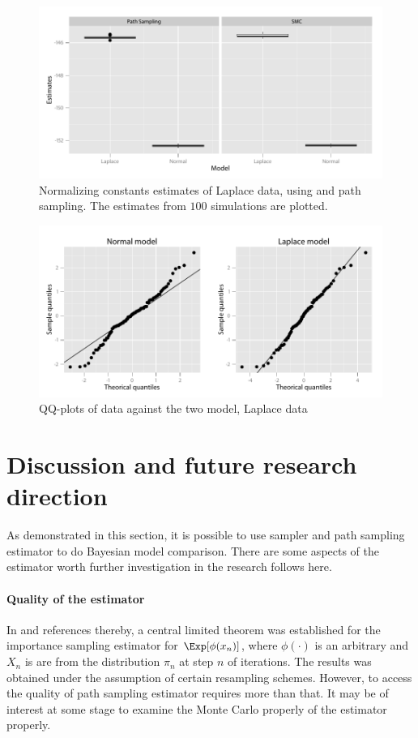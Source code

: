 \begin{figure}[htb]
  \centering
  \includegraphics{fig/5-lz}
  \caption{Normalizing constants estimates of Laplace data, using \smc and
    path sampling. The estimates from $100$ simulations are plotted.}
  \label{fig:laplace_z}
\end{figure}

\begin{figure}[htb]
  \centering
  \includegraphics{fig/5-lqq}
  \caption{QQ-plots of data against the two model, Laplace data}
  \label{fig:laplace_qq}
\end{figure}

\section{Discussion and future research direction}
\label{sec:Discussion and future research direction}

As demonstrated in this section, it is possible to use \smc sampler and path
sampling estimator to do Bayesian model comparison. There are some aspects of
the estimator worth further investigation in the research follows here. 

\paragraph{Quality of the estimator} In \textcite{DelMoral2006} and references
thereby, a central limited theorem was established for the importance sampling
estimator for $\Exp[\phi(x_n)]$, where $\phi(\cdot)$ is an arbitrary and $X_n$
is are from the distribution $\pi_n$ at step $n$ of \smc iterations. The
results was obtained under the assumption of certain resampling schemes.
However, to access the quality of path sampling estimator requires more than
that. It may be of interest at some stage to examine the Monte Carlo properly
of the estimator properly.

